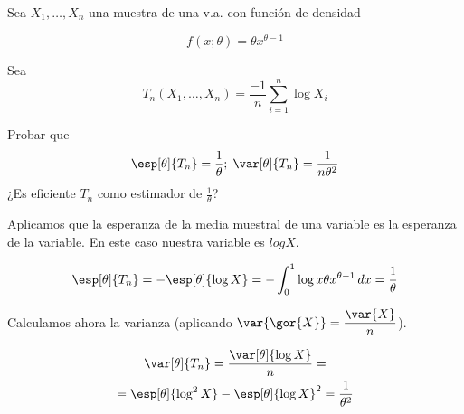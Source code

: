 \begin{problem}[9] Sea $X_1,\dotsc,X_n$ una muestra de una v.a. con función de densidad 

\[ f(x;\theta) = \theta x^{\theta - 1} \]

Sea  \[ T_n(X_1,\dotsc,X_n) = \frac{-1}{n}\sum_{i=1}^n\log X_i \]

\ppart Probar que \[\esp[\theta]{T_n} = \frac{1}{\theta};\; \var[\theta]{T_n} = \frac{1}{n\theta^2} \]
\ppart ¿Es eficiente $T_n$ como estimador de $\frac{1}{\theta}$?

\solution

\spart
Aplicamos que la esperanza de la media muestral de una variable es la esperanza de la variable. En este caso nuestra variable es $log X$.

\[ \esp[\theta]{T_n} = -\esp[\theta]{\log X} = - \int_0^1 \log x \theta x ^{\theta-1}\,dx = \frac{1}{\theta} \]

Calculamos ahora la varianza (aplicando $\displaystyle \var{\gor{X}} = \frac{\var{X}}{n}$).

\begin{gather*}
\var[\theta]{T_n} = \frac{\var[\theta]{\log X}}{n} = \\
= \esp[\theta]{\log^2 X} - \esp[\theta]{\log X}^2 = \frac{1}{\theta^2}
\end{gather*}

\end{problem}


